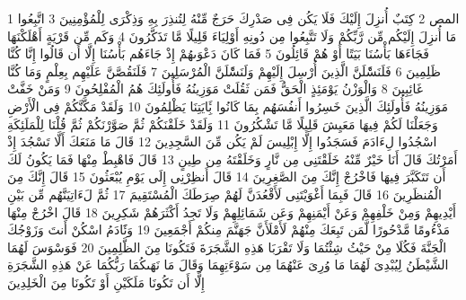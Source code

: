 \documentclass[20pt,a4paper]{article}
\title{}
\author{}
\date{}
\begin{document}
\pagecolor{cl_page}



{\tiny\colorbox{cl_aya}{1}} المص
{\tiny\colorbox{cl_aya}{2}} كِتَبٌ أُنزِلَ إِلَيْكَ فَلَا يَكُن فِى صَدْرِكَ حَرَجٌ مِّنْهُ لِتُنذِرَ بِهِ وَذِكْرَى لِلْمُؤْمِنِينَ
{\tiny\colorbox{cl_aya}{3}} اتَّبِعُوا مَا أُنزِلَ إِلَيْكُم مِّن رَّبِّكُمْ وَلَا تَتَّبِعُوا مِن دُونِهِ أَوْلِيَاءَ قَلِيلًا مَّا تَذَكَّرُونَ
{\tiny\colorbox{cl_aya}{4}} وَكَم مِّن قَرْيَةٍ أَهْلَكْنَهَا فَجَاءَهَا بَأْسُنَا بَيَتًا أَوْ هُمْ قَائِلُونَ
{\tiny\colorbox{cl_aya}{5}} فَمَا كَانَ دَعْوَىهُمْ إِذْ جَاءَهُم بَأْسُنَا إِلَّا أَن قَالُوا إِنَّا كُنَّا ظَلِمِينَ
{\tiny\colorbox{cl_aya}{6}} فَلَنَسَْٔلَنَّ الَّذِينَ أُرْسِلَ إِلَيْهِمْ وَلَنَسَْٔلَنَّ الْمُرْسَلِينَ
{\tiny\colorbox{cl_aya}{7}} فَلَنَقُصَّنَّ عَلَيْهِم بِعِلْمٍ وَمَا كُنَّا غَائِبِينَ
{\tiny\colorbox{cl_aya}{8}} وَالْوَزْنُ يَوْمَئِذٍ الْحَقُّ فَمَن ثَقُلَتْ مَوَزِينُهُ فَأُولَئِكَ هُمُ الْمُفْلِحُونَ
{\tiny\colorbox{cl_aya}{9}} وَمَنْ خَفَّتْ مَوَزِينُهُ فَأُولَئِكَ الَّذِينَ خَسِرُوا أَنفُسَهُم بِمَا كَانُوا بَِٔايَتِنَا يَظْلِمُونَ
{\tiny\colorbox{cl_aya}{10}} وَلَقَدْ مَكَّنَّكُمْ فِى الْأَرْضِ وَجَعَلْنَا لَكُمْ فِيهَا مَعَيِشَ قَلِيلًا مَّا تَشْكُرُونَ
{\tiny\colorbox{cl_aya}{11}} وَلَقَدْ خَلَقْنَكُمْ ثُمَّ صَوَّرْنَكُمْ ثُمَّ قُلْنَا لِلْمَلَئِكَةِ اسْجُدُوا لِءَادَمَ فَسَجَدُوا إِلَّا إِبْلِيسَ لَمْ يَكُن مِّنَ السَّجِدِينَ
{\tiny\colorbox{cl_aya}{12}} قَالَ مَا مَنَعَكَ أَلَّا تَسْجُدَ إِذْ أَمَرْتُكَ قَالَ أَنَا خَيْرٌ مِّنْهُ خَلَقْتَنِى مِن نَّارٍ وَخَلَقْتَهُ مِن طِينٍ
{\tiny\colorbox{cl_aya}{13}} قَالَ فَاهْبِطْ مِنْهَا فَمَا يَكُونُ لَكَ أَن تَتَكَبَّرَ فِيهَا فَاخْرُجْ إِنَّكَ مِنَ الصَّغِرِينَ
{\tiny\colorbox{cl_aya}{14}} قَالَ أَنظِرْنِى إِلَى يَوْمِ يُبْعَثُونَ
{\tiny\colorbox{cl_aya}{15}} قَالَ إِنَّكَ مِنَ الْمُنظَرِينَ
{\tiny\colorbox{cl_aya}{16}} قَالَ فَبِمَا أَغْوَيْتَنِى لَأَقْعُدَنَّ لَهُمْ صِرَطَكَ الْمُسْتَقِيمَ
{\tiny\colorbox{cl_aya}{17}} ثُمَّ لَءَاتِيَنَّهُم مِّن بَيْنِ أَيْدِيهِمْ وَمِنْ خَلْفِهِمْ وَعَنْ أَيْمَنِهِمْ وَعَن شَمَائِلِهِمْ وَلَا تَجِدُ أَكْثَرَهُمْ شَكِرِينَ
{\tiny\colorbox{cl_aya}{18}} قَالَ اخْرُجْ مِنْهَا مَذْءُومًا مَّدْحُورًا لَّمَن تَبِعَكَ مِنْهُمْ لَأَمْلَأَنَّ جَهَنَّمَ مِنكُمْ أَجْمَعِينَ
{\tiny\colorbox{cl_aya}{19}} وَئََادَمُ اسْكُنْ أَنتَ وَزَوْجُكَ الْجَنَّةَ فَكُلَا مِنْ حَيْثُ شِئْتُمَا وَلَا تَقْرَبَا هَذِهِ الشَّجَرَةَ فَتَكُونَا مِنَ الظَّلِمِينَ
{\tiny\colorbox{cl_aya}{20}} فَوَسْوَسَ لَهُمَا الشَّيْطَنُ لِيُبْدِىَ لَهُمَا مَا وُرِىَ عَنْهُمَا مِن سَوْءَتِهِمَا وَقَالَ مَا نَهَىكُمَا رَبُّكُمَا عَنْ هَذِهِ الشَّجَرَةِ إِلَّا أَن تَكُونَا مَلَكَيْنِ أَوْ تَكُونَا مِنَ الْخَلِدِينَ
\end{document}
